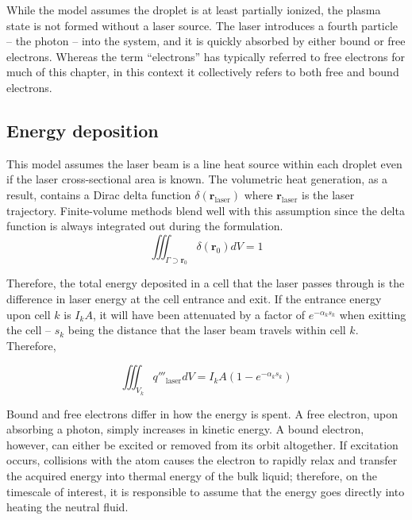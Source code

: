 While the model assumes the droplet is at least partially ionized, the plasma state is not formed without a laser source. The laser introduces a fourth particle -- the photon -- into the system, and it is quickly
absorbed by either bound or free electrons. Whereas the term ``electrons'' has typically referred to free electrons for much of this chapter, in this context it collectively refers to both free and bound electrons.

\subsection{Energy deposition}
This model assumes the laser beam is a line heat source within each droplet even if the laser cross-sectional area is known. The volumetric heat generation, as a result, contains a Dirac delta function
$\delta(\bm{r}_{\text{laser}})$ where $\bm{r}_{\text{laser}}$ is the laser trajectory. Finite-volume methods blend well with this assumption since the delta function is always integrated out during the formulation.
\begin{equation}
    \iiint_{\Gamma \supset \bm{r}_0 } \delta(\bm{r}_0) dV = 1
\end{equation}

Therefore, the total energy deposited in a cell that the laser passes through is the difference in laser energy at the cell entrance and exit. If the entrance energy upon cell $k$ is $I_k A$, it will have been
attenuated by a factor of $e^{-\alpha_k s_k}$ when exitting the cell -- $s_k$ being the distance that the laser beam travels within cell $k$. Therefore,

\begin{equation}
    \iiint_{V_k} q'''_{\text{laser}} dV = I_k A (1 - e^{-\alpha_k s_k})
\end{equation}

Bound and free electrons differ in how the energy is spent. A free electron, upon absorbing a photon, simply increases in kinetic energy. A bound electron, however, can either be excited or removed from its orbit altogether.
If excitation occurs, collisions with the atom causes the electron to rapidly relax and transfer the acquired energy into thermal energy of the bulk liquid; therefore, on the timescale of interest, it is responsible
to assume that the energy goes directly into heating the neutral fluid.

